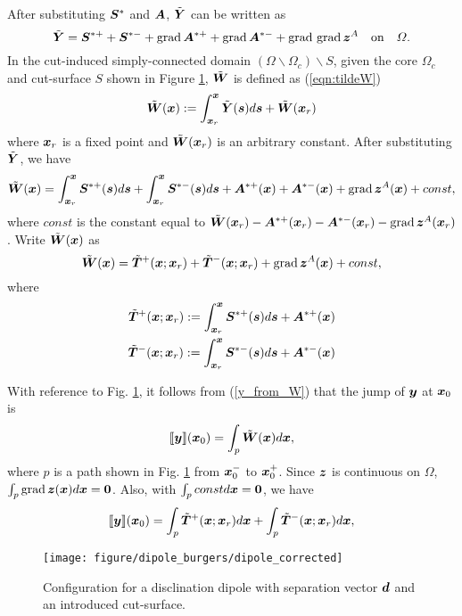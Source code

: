 \documentclass[11pt,letterpaper]{article}
\begin{document}
After substituting $\bfS^{*}$ and $\bfA$, $\tilde{\bfY}$ can be written as 
\[
\tilde{\bfY} = \bfS^{*+}+\bfS^{*-}+ \grad \bfA^{*+} + \grad \bfA^{*-} + \grad \, \grad \bfz^A \ \ \ \mbox{on} \ \ \ \Omega.
\]
In the cut-induced simply-connected domain $(\Omega \backslash \Omega_c)\backslash S$, given the core $\Omega_c$ and cut-surface $S$  shown in Figure \ref{fig:dipole_burgers}, $\tilde{\bfW}$ is defined as (\ref{eqn:tildeW})
\[
\tilde{\bfW}(\bfx) := \int_{\bfx_r}^{\bfx} \tilde{\bfY}(\bfs) d\bfs+ \tilde{\bfW}(\bfx_r)
\]
where $\bfx_r$ is a fixed point and $\tilde{\bfW}(\bfx_r)$ is an arbitrary constant. After substituting $\tilde{\bfY}$, we have
\[
\tilde{\bfW}(\bfx) = \int_{\bfx_r}^{\bfx}\bfS^{*+}(\bfs) d\bfs + \int_{\bfx_r}^{\bfx}\bfS^{*-}(\bfs) d\bfs+ \bfA^{*+}(\bfx) + \bfA^{*-}(\bfx) + \grad\bfz^A(\bfx)+ const,
\]
where $const$ is the constant equal to $\tilde{\bfW}(\bfx_r)-\bfA^{*+}(\bfx_r) - \bfA^{*-}(\bfx_r) - \grad\bfz^A(\bfx_r)$. Write $\tilde{\bfW}(\bfx)$ as 
\[
\tilde{\bfW}(\bfx) = \tilde{\bfT}^{+}(\bfx; \bfx_r) + \tilde{\bfT}^{-}(\bfx; \bfx_r) + \grad \bfz^A(\bfx) + const,
\]
where 
\begin{eqnarray*}
\tilde{\bfT}^{+}(\bfx; \bfx_r)  :=  \int_{\bfx_r}^{\bfx}\bfS^{*+}(\bfs) d\bfs  + \bfA^{*+}(\bfx)  \\
\tilde{\bfT}^{-}(\bfx; \bfx_r)  :=  \int_{\bfx_r}^{\bfx}\bfS^{*-}(\bfs) d\bfs  + \bfA^{*-}(\bfx)
\end{eqnarray*}

With reference to Fig. \ref{fig:dipole_burgers}, it follows from (\ref{y_from_W}) that the jump of $\bfy$ at $\bfx_0$ is
\[
\llbracket\bfy\rrbracket  (\bfx_0)= \int_p \tilde{\bfW}(\bfx) d\bfx,
\]
where $p$ is a path shown in Fig. \ref{fig:dipole_burgers} from $\bfx_0^-$ to $\bfx_0^+$. Since $\bfz$ is continuous on $\Omega$, $\int_p \grad \bfz (\bfx) d\bfx=\bf0$. Also, with $\int_p const d\bfx=\bf0$, we have
\[
\llbracket \bfy \rrbracket (\bfx_0)= \int_p \tilde{\bfT}^+(\bfx;\bfx_r) d\bfx + \int_p \tilde{\bfT}^-(\bfx;\bfx_r) d\bfx,
\]

\begin{figure}
\centering
\texttt{[image: figure/dipole\_burgers/dipole\_corrected]}
\caption{Configuration for a disclination dipole with separation vector $\bfd$ and an introduced cut-surface.}
\label{fig:dipole_burgers}
\end{figure}
\end{document}
